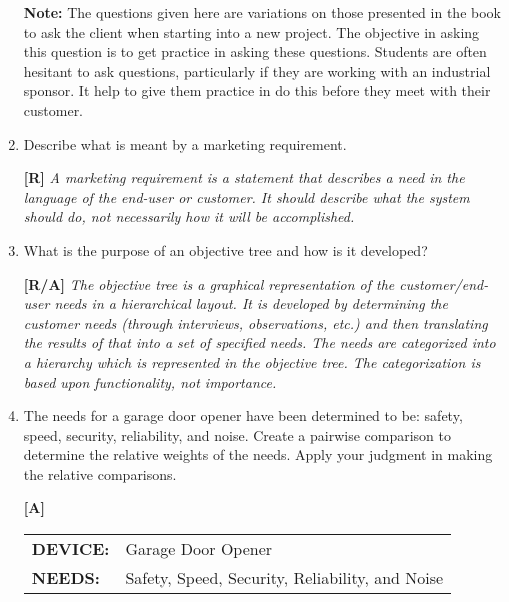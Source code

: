 \begin{enumerate}
\begin{onlysolution}
     \hspace*{1cm}
  \begin{minipage}{.8\textwidth}
  \textbf{Note:} The questions given here are variations on those presented in 
  the book to ask the client when starting into a new project. The objective 
  in asking this question is to get practice in asking these questions. Students 
  are often hesitant to ask questions, particularly if they are working with an 
  industrial sponsor. It help to give them practice in do this before they meet 
  with their customer.
  \end{minipage}
  \end{onlysolution}

\item
  Describe what is meant by a marketing requirement.

  \begin{onlysolution}
  \textbf{[R]}
  \itshape
  A marketing requirement is a statement that describes a need in the language 
  of the end-user or customer. It should describe what the system should do, not 
  necessarily how it will be accomplished.
  \end{onlysolution}

\item
  What is the purpose of an objective tree and how is it developed?
  
  \begin{onlysolution}
  \textbf{[R/A]}
  \itshape
  The objective tree is a graphical representation of the customer/end-user needs 
  in a hierarchical layout. It is developed by determining the customer needs 
  (through interviews, observations, etc.) and then translating the results of 
  that into a set of specified needs. The needs are categorized into a hierarchy 
  which is represented in the objective tree. The categorization is based upon 
  functionality, not importance.
  \end{onlysolution}

\item
  The needs for a garage door opener have been determined to be: safety,
  speed, security, reliability, and noise. Create a pairwise comparison
  to determine the relative weights of the needs. Apply your judgment in
  making the relative comparisons.

  
  \begin{onlysolution}
  \textbf{[A]}
  \itshape

\begin{tabular}{ll}
\textbf{DEVICE:} 	& Garage Door Opener \\ 
\textbf{NEEDS:}	& Safety, Speed, Security, Reliability, and Noise \\ 
\end{tabular}


\end{onlysolution}
\end{enumerate}
